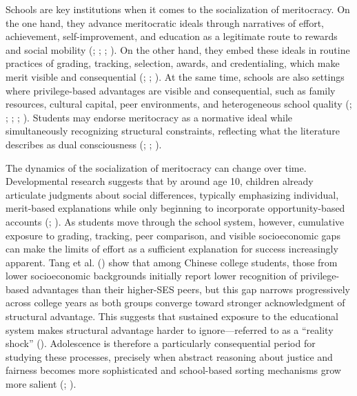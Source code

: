 \documentclass[
  11pt,
]{article}
\begin{document}
Schools are key institutions when it comes to the socialization of
meritocracy. On the one hand, they advance meritocratic ideals through
narratives of effort, achievement, self-improvement, and education as a
legitimate route to rewards and social mobility
(;
;
;
). On the
other hand, they embed these ideals in routine practices of grading,
tracking, selection, awards, and credentialing, which make merit visible
and consequential (; ;
). At the same
time, schools are also settings where privilege-based advantages are
visible and consequential, such as family resources, cultural capital,
peer environments, and heterogeneous school quality
(;
;
;
;
). Students may endorse
meritocracy as a normative ideal while simultaneously recognizing
structural constraints, reflecting what the literature describes as dual
consciousness (; ;
).

The dynamics of the socialization of meritocracy can change over time.
Developmental research suggests that by around age 10, children already
articulate judgments about social differences, typically emphasizing
individual, merit-based explanations while only beginning to incorporate
opportunity-based accounts (; ).
As students move through the school system, however, cumulative exposure
to grading, tracking, peer comparison, and visible socioeconomic gaps
can make the limits of effort as a sufficient explanation for success
increasingly apparent. Tang et al.
() show that among Chinese
college students, those from lower socioeconomic backgrounds initially
report lower recognition of privilege-based advantages than their
higher-SES peers, but this gap narrows progressively across college
years as both groups converge toward stronger acknowledgment of
structural advantage. This suggests that sustained exposure to the
educational system makes structural advantage harder to
ignore---referred to as a ``reality shock''
(). Adolescence is therefore a
particularly consequential period for studying these processes,
precisely when abstract reasoning about justice and fairness becomes
more sophisticated and school-based sorting mechanisms grow more salient
(;
).
\end{document}
